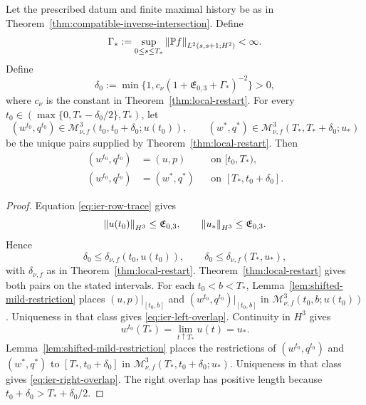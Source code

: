 \begin{lemma}
\label{lem:ier-late-slice-overlap}
Let the prescribed datum and finite maximal history be as in
Theorem~\ref{thm:compatible-inverse-intersection}.
Define
\[
 \Gamma_*:=\sup_{0\le s\le T_*}
 \left\lVert \mathbb P f\right\rVert_{L^2(s,s+1;H^2)}<\infty.
\]
Define
\begin{equation}
 \delta_0
 :=\min\{1,c_\nu(1+\mathfrak E_{0,3}+\Gamma_*)^{-2}\}>0,
 \label{eq:ier-uniform-restart-time}
\end{equation}
where \(c_\nu\) is the constant in Theorem~\ref{thm:local-restart}.
For every
\(t_0\in(\max\{0,T_*-\delta_0/2\},T_*)\), let
\[
 (w^{t_0},q^{t_0})
 \in\mathscr M_{\nu,f}^3(t_0,t_0+\delta_0;u(t_0)),
 \qquad
 (w^*,q^*)
 \in\mathscr M_{\nu,f}^3(T_*,T_*+\delta_0;u_*)
\]
be the unique pairs supplied by Theorem~\ref{thm:local-restart}.  Then
\begin{align}
 (w^{t_0},q^{t_0})&=(u,p)
 &&\text{on }[t_0,T_*),
 \label{eq:ier-left-overlap}\\
 (w^{t_0},q^{t_0})&=(w^*,q^*)
 &&\text{on }[T_*,t_0+\delta_0].
 \label{eq:ier-right-overlap}
\end{align}
\end{lemma}

\begin{proof}
Equation \eqref{eq:ier-row-trace} gives
\[
 \left\lVert u(t_0)\right\rVert_{H^3}\le\mathfrak E_{0,3},
 \qquad
 \left\lVert u_*\right\rVert_{H^3}\le\mathfrak E_{0,3}.
\]
Hence
\[
 \delta_0\le\delta_{\nu,f}(t_0,u(t_0)),
 \qquad
 \delta_0\le\delta_{\nu,f}(T_*,u_*),
\]
with \(\delta_{\nu,f}\) as in Theorem~\ref{thm:local-restart}.
Theorem~\ref{thm:local-restart} gives both pairs on the stated intervals.
For each \(t_0<b<T_*\), Lemma~\ref{lem:shifted-mild-restriction} places
\((u,p)|_{[t_0,b]}\) and
\((w^{t_0},q^{t_0})|_{[t_0,b]}\) in
\(\mathscr M_{\nu,f}^3(t_0,b;u(t_0))\).  Uniqueness in that class gives
\eqref{eq:ier-left-overlap}.  Continuity in \(H^3\) gives
\[
 w^{t_0}(T_*)=\lim_{t\uparrow T_*}u(t)=u_*.
\]
Lemma~\ref{lem:shifted-mild-restriction} places the restrictions of
\((w^{t_0},q^{t_0})\) and \((w^*,q^*)\) to
\([T_*,t_0+\delta_0]\) in
\(\mathscr M_{\nu,f}^3(T_*,t_0+\delta_0;u_*)\).  Uniqueness in that class gives
\eqref{eq:ier-right-overlap}.  The right overlap has positive length because
\(t_0+\delta_0>T_*+\delta_0/2\).
\end{proof}

